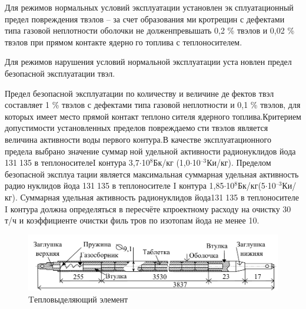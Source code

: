 \documentclass[14pt]{article}
\begin{document}
	Для  режимов  нормальных  условий  эксплуатации  установлен  эксплуатационный предел повреждения твэлов – за счет образования микротрещин с дефектами типа газовой неплотности оболочки не долженпревышать 0,2 \% твэлов и 0,02 \% твэлов при прямом контакте ядерного топлива с теплоносителем.
	
	Для режимов нарушения условий нормальной эксплуатации установлен предел безопасной эксплуатации твэл.
	
	Предел  безопасной  эксплуатации  по  количеству  и  величине  дефектов твэл составляет 1 \% твэлов с дефектами типа газовой неплотности и 0,1 \% твэлов, для которых имеет место прямой контакт теплоносителя ядерного топлива.Критерием  допустимости  установленных  пределов  повреждаемости твэлов является величина активности воды первого контура.В качестве эксплуатационного предела выбрано значение суммарной удельной активности радионуклидов йода 131135 в теплоносителеI контура 3,7$\cdot$10$^{8}$Бк/кг (1,0$\cdot$10$^{–3}$Ки/кг). Пределом безопасной эксплуатации  является  максимальная  суммарная  удельная  активность  радионуклидов  йода  131135  в  теплоносителе  I  контура  1,85$\cdot$10$^{8}$Бк/кг(5$\cdot$10$^{–3}$Ки/кг).  Суммарная  удельная  активность  радионуклидов  йода131135  в  теплоносителе  I  контура  должна  определяться  в  пересчёте  кпроектному расходу на очистку 30 т/ч и коэффициенте очистки фильтров по изотопам йода не менее 10.
	
	\begin{figure}
	    \centering
	    \includegraphics[width=\linewidth]{Picture1}
	    \caption{Tепловыделяющий элемент}
	    \label{fig:my_label}
	\end{figure}
\end{document}
